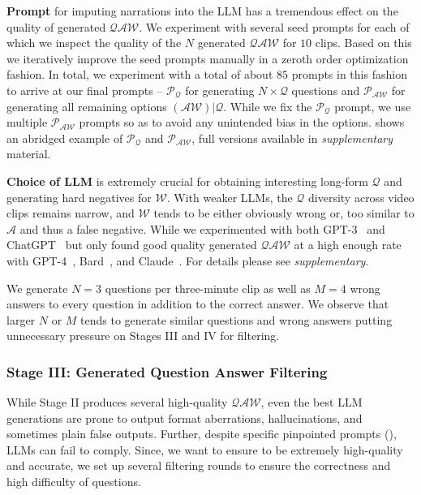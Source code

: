 \noindent \textbf{Prompt} for imputing narrations into the LLM has a tremendous effect on the quality of generated $\mathcal{QAW}$. We experiment with several seed prompts for each of which we inspect the quality of the $N$ generated $\mathcal{QAW}$ for $10$ clips. Based on this we iteratively improve the seed prompts manually in a zeroth order optimization fashion. In total, we experiment with a total of about $85$ prompts in this fashion to arrive at our final \name{}{} prompts -- $\mathcal{P}_\mathcal{Q}$ for generating $N \times \mathcal{Q}$ questions and $\mathcal{P}_\mathcal{AW}$ for generating all remaining options $\mathcal{(AW)} | \mathcal{Q}$. While we fix the $\mathcal{P}_\mathcal{Q}$ prompt, we use multiple $\mathcal{P}_\mathcal{AW}$ prompts so as to avoid any unintended bias in the options.  shows an abridged example of $\mathcal{P}_\mathcal{Q}$ and $\mathcal{P}_\mathcal{AW}$, full versions available in \textit{supplementary} material.  

\noindent \textbf{Choice of LLM} is extremely crucial for obtaining interesting long-form $\mathcal{Q}$ and generating hard negatives for $\mathcal{W}$. With weaker LLMs, the $\mathcal{Q}$ diversity across video clips remains narrow, and $\mathcal{W}$ tends to be either obviously wrong or, too similar to $\mathcal{A}$ and thus a false negative. While we experimented with both GPT-3~\cite{gpt3} and ChatGPT~\cite{chatgpt} but only found good quality generated $\mathcal{QAW}$ at a high enough rate with GPT-4~\cite{gpt4}, Bard~\cite{bard}, and Claude~\cite{claude}. For details please see \textit{supplementary}. 

We generate $N = 3$ questions per three-minute clip as well as $M = 4$ wrong answers to every question in addition to the correct answer. We observe that larger $N$ or $M$ tends to generate similar questions and wrong answers putting unnecessary pressure on Stages III and IV for filtering.

\subsubsection{Stage III: Generated Question Answer Filtering}
 \label{sec:stage3}
 
While Stage II produces several high-quality $\mathcal{QAW}$, even the best LLM generations are prone to output format aberrations, hallucinations, and sometimes plain false outputs. Further, despite specific pinpointed prompts (), LLMs can fail to comply. Since, we want to ensure\name{}{} to be extremely high-quality and accurate, we set up several filtering rounds to ensure the correctness and high difficulty of questions. 

